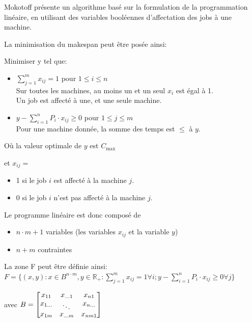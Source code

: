 \documentclass[a4paper,12pt]{report}
\theoremstyle{plain}				%
\theoremstyle{definition}				%
\newcommand{\tdi}[1]{\todo[inline]{{#1}}{}}
\begin{document}
Mokotoff \cite{mokoto1999scheduling} présente un algorithme basé sur
la formulation de la programmation linéaire, en utilisant des
variables booléennes d'affectation des jobs à une machine.

\tdi{LP: définir $x_{ij}$}
\bigskip
La minimisation du makespan peut être posée ainsi:

Minimiser y tel que:

\begin{itemize}
\item $\sum_{j=1}^{m}x_{ij}=1$ \quad pour $1 \leq i \leq n$ 		\\
Sur toutes les machines, au moins un et un seul $x_i$ est égal à 1.	\\
Un job est affecté à une, et une seule machine.

\item $y-\sum_{i=1}^{n}P_i \cdot x_{ij} \geq 0$ \quad pour $1 \leq j \leq m$ \\
Pour une machine donnée, la somme des temps est $\leq$ à $y$.
\end{itemize}

\bigskip
Où	\quad	la valeur optimale de $y$ est $C_{\max}$

et	\quad	$x_{ij} =$

\begin{itemize}
\item 1 si le job $i$ est affecté à la machine $j$.
\item 0 si le job $i$ n'est pas affecté à la machine $j$.
\end{itemize}

 \bigskip
 Le programme linéaire est donc composé de
 \begin{itemize}
 \item $n \cdot m + 1$ variables (les variables $x_{ij}$ et la variable $y$)
 \item $n+m$ contraintes
 \end{itemize}

\bigskip
La zone F peut être définie ainsi: \\
$F=\{ (x,y) : x \in B^{n \cdot m}, y \in \mathbb{R_+} : \sum_{j=1}^{m} x_{ij}=1 \forall i;
y-\sum_{i=1}^{n} P_i \cdot x_{ij} \geq 0 \forall j \}$

avec $B=\begin{bmatrix}
x_{11}&x_{\dots 1}&x_{n1}\\
x_{1 \dots}& \rotatebox{-30}{\dots}&x_{n \dots}\\
x_{1m}&x_{\dots m}&x_{nm1}
\end{bmatrix}$
\end{document}
